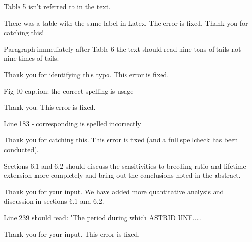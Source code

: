 \documentclass[answers,11pt]{exam}
\begin{document}
\begin{questions}
        \question Table 5 isn't referred to in the text.

        \begin{solution}
                There was a table with the same label in Latex. The error
                is fixed. Thank you for catching this!
        \end{solution}

        \question Paragraph immediately after Table 6 the text should read nine 
        tons of tails not nine times of tails.
        \begin{solution}
                Thank you for identifying this typo. This error is fixed.
        \end{solution}

        \question Fig 10 caption: the correct spelling is usage

        \begin{solution}
                Thank you. This error is fixed.
        \end{solution}

        \question Line 183 - corresponding is spelled incorrectly
        \begin{solution}
                Thank you for catching this. This error is fixed 
                (and a full spellcheck has been conducted).
        \end{solution}

        \question Sections 6.1 and 6.2 should discuss the sensitivities to 
        breeding ratio and lifetime extension more completely and bring out the 
        conclusions noted in the abstract.

        \begin{solution}
                Thank you for your input. We have added more quantitative
                analysis and discussion in sections 6.1 and 6.2.
        \end{solution}

        \question Line 239 should read: "The period during which ASTRID UNF.....
        \begin{solution}
                Thank you for your input. This error is fixed.
        \end{solution}


\end{questions}
\end{document}
